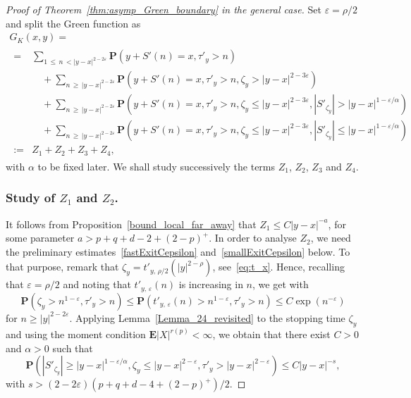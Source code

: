 \documentclass[AHL,Unicode,longabstracts,published]{cedram}
\newcommand{\pr}{\mathbf{P}}
\newcommand{\e}{\mathbf{E}}
\renewcommand{\epsilon}{\varepsilon}
\renewcommand{\leq}{\leqslant}
\renewcommand{\geq}{\geqslant}
\begin{document}
\begin{proof}[Proof of Theorem~\ref{thm:asymp_Green_boundary} in the general case]
Set $\epsilon=\rho/2$ and split the Green function as
\begin{multline*}
G_K(x,y)=\\
\begin{aligned}
=& \sum_{1\,\leq\,n\,<|y-x|^{2-2\epsilon}}\pr\left(y+S'(n)=x,\tau'_{y}>n\right)\\
&\quad+\sum_{n\,\geq\,| y-x|^{2-2\epsilon}}\pr\left(y+S'(n)=x,\tau'_{y}>n,\zeta_{y}> | y-x|^{2-3\epsilon}\right)\\
&\quad+\sum_{n\,\geq\,|y-x|^{2-2\epsilon}}\pr\left(y+S'(n)=x,\tau'_{y}>n,\zeta_{y}\leq | y-x|^{2-3\epsilon},\left|S'_{\zeta_{y}}\right|> |y-x|^{1-\epsilon/\alpha}\right)\\
&\quad+\sum_{n\,\geq\,|y-x|^{2-2\epsilon}}\pr\left(y+S'(n)=x,\tau'_{y}>n,\zeta_{y}\leq |y-x|^{2-3\epsilon},\left|S'_{\zeta_{y}}\right| \leq |y-x|^{1-\epsilon/\alpha}\right)\\
:=& Z_{1}+Z_{2}+Z_{3}+Z_{4},
\end{aligned}
\end{multline*}
with $\alpha$ to be fixed later. We shall study successively the terms $Z_1$, $Z_2$, $Z_3$ and $Z_4$.



\subsubsection*{Study of \texorpdfstring{$Z_1$}{Z1} and \texorpdfstring{$Z_2$}{Z2}.}

It follows from Proposition~\ref{bound_local_far_away} that $Z_{1}\leq C| y-x|^{-a}$, for some parameter $a>p+q+d-2+(2-p)^{+}$. In order to analyse $Z_2$, we need the preliminary estimates~\eqref{fastExitCepsilon} and~\eqref{smallExitCepsilon} below. To that purpose, remark that $\zeta_{y}=t'_{y,\,\rho/2}(|y|^{2-\rho})$, see~\eqref{eq:t_x}. Hence, recalling that $\epsilon=\rho/2$ and noting that $t'_{y,\,\epsilon}(n)$ is increasing in $n$, we get with~\cite[Lemma~14]{DeWa-15}
\begin{equation}\label{fastExitCepsilon}
\pr\left(\zeta_{y}>n^{1-\epsilon}, \tau'_{y}> n\right)\leq \pr\left(t'_{y,\,\epsilon}(n)>n^{1-\epsilon}, \tau'_{y}> n\right) \leq C\exp\left(n^{-\epsilon}\right)
\end{equation}
for $n\geq |y|^{2-2\epsilon}$. Applying Lemma~\ref{Lemma_24_revisited} to the stopping time $\zeta_{y}$ and using the moment condition $\e|X|^{r(p)}<\infty$, we obtain that there exist $C>0$ and $\alpha>0$ such that
\begin{equation}\label{smallExitCepsilon}
\pr\left(\left|S'_{\zeta_{y}}\right| \geq |y-x|^{1-\epsilon/\alpha},\zeta_{y}\leq | y-x|^{2-\epsilon}, \tau'_{y}> | y-x|^{2-\epsilon}\right)\leq C|y-x|^{-s},
\end{equation}
with $s>(2-2\epsilon)(p+q+d-4+(2-p)^{+})/2$.


\end{proof}
\end{document}
